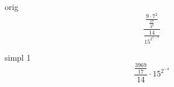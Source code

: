 \documentclass[a4paper, 12pt]{article}
\begin{document}
                          
orig \[  \frac { \frac {{{9} \cdot {{7} ^ {2}}}} { \frac {{17}} {{{3} ^ {2}}}}} { \frac {{14}} {{{15} ^ {{2} ^ {{5} - {9}}}}}} \]

simpl 1 \[ { \frac { \frac {{3969}} {{17}}} {{14}} \cdot {{15} ^ {{2} ^ {-4}}}} \]
\end{document}
